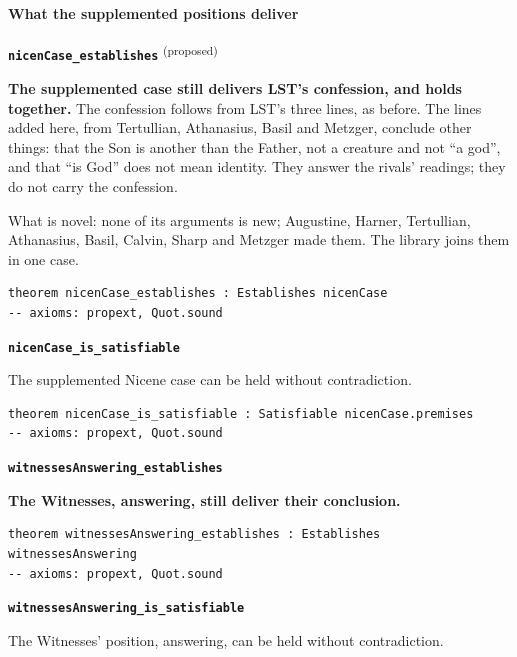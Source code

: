 \documentclass[11pt,paper=\testimonypaper,DIV=13,parskip=false]{scrartcl}
\begin{document}
\paragraph*{What the supplemented positions deliver}
\leavevmode\par\nobreak
\par\medskip\noindent\textbf{\texttt{nicen\allowbreak{}Case\_\allowbreak{}establishes}} \textsuperscript{(proposed)}\par\nobreak\noindent
\textbf{The supplemented case still delivers LST’s confession, and holds together.} The confession follows from LST’s three lines, as before. The lines added here, from Tertullian, Athanasius, Basil and Metzger, conclude other things: that the Son is another than the Father, not a creature and not “a god”, and that “is God” does not mean identity. They answer the rivals’ readings; they do not carry the confession.

What is novel: none of its arguments is new; Augustine, Harner, Tertullian, Athanasius, Basil, Calvin, Sharp and Metzger made them. The library joins them in one case.

{\small\begin{verbatim}
theorem nicenCase_establishes : Establishes nicenCase
-- axioms: propext, Quot.sound
\end{verbatim}}
\par\medskip\noindent\textbf{\texttt{nicen\allowbreak{}Case\_\allowbreak{}is\_\allowbreak{}satisfiable}}\par\nobreak\noindent
The supplemented Nicene case can be held without contradiction.

{\small\begin{verbatim}
theorem nicenCase_is_satisfiable : Satisfiable nicenCase.premises
-- axioms: propext, Quot.sound
\end{verbatim}}
\par\medskip\noindent\textbf{\texttt{witnesses\allowbreak{}Answering\_\allowbreak{}establishes}}\par\nobreak\noindent
\textbf{The Witnesses, answering, still deliver their conclusion.}

{\small\begin{verbatim}
theorem witnessesAnswering_establishes : Establishes witnessesAnswering
-- axioms: propext, Quot.sound
\end{verbatim}}
\par\medskip\noindent\textbf{\texttt{witnesses\allowbreak{}Answering\_\allowbreak{}is\_\allowbreak{}satisfiable}}\par\nobreak\noindent
The Witnesses’ position, answering, can be held without contradiction.
\end{document}

